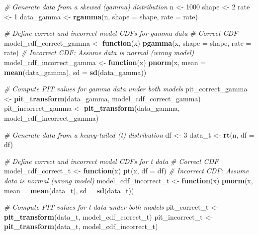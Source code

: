 \documentclass[
  letterpaper,
]{krantz}
\newenvironment{Shaded}{\begin{snugshade}}{\end{snugshade}}
\newcommand{\AttributeTok}[1]{\textcolor[rgb]{0.13,0.29,0.53}{#1}}
\newcommand{\CommentTok}[1]{\textcolor[rgb]{0.56,0.35,0.01}{\textit{#1}}}
\newcommand{\ControlFlowTok}[1]{\textcolor[rgb]{0.13,0.29,0.53}{\textbf{#1}}}
\newcommand{\DecValTok}[1]{\textcolor[rgb]{0.00,0.00,0.81}{#1}}
\newcommand{\FunctionTok}[1]{\textcolor[rgb]{0.13,0.29,0.53}{\textbf{#1}}}
\newcommand{\NormalTok}[1]{#1}
\newcommand{\OtherTok}[1]{\textcolor[rgb]{0.56,0.35,0.01}{#1}}
\begin{document}
\begin{Shaded}
\begin{Highlighting}[]
\CommentTok{\# Generate data from a skewed (gamma) distribution}
\NormalTok{n }\OtherTok{\textless{}{-}} \DecValTok{1000}
\NormalTok{shape }\OtherTok{\textless{}{-}} \DecValTok{2}
\NormalTok{rate }\OtherTok{\textless{}{-}} \DecValTok{1}
\NormalTok{data\_gamma }\OtherTok{\textless{}{-}} \FunctionTok{rgamma}\NormalTok{(n, }\AttributeTok{shape =}\NormalTok{ shape, }\AttributeTok{rate =}\NormalTok{ rate)}

\CommentTok{\# Define correct and incorrect model CDFs for gamma data}
\CommentTok{\# Correct CDF}
\NormalTok{model\_cdf\_correct\_gamma }\OtherTok{\textless{}{-}} \ControlFlowTok{function}\NormalTok{(x) }\FunctionTok{pgamma}\NormalTok{(x, }\AttributeTok{shape =}\NormalTok{ shape, }\AttributeTok{rate =}\NormalTok{ rate)}
\CommentTok{\# Incorrect CDF: Assume data is normal (wrong model)}
\NormalTok{model\_cdf\_incorrect\_gamma }\OtherTok{\textless{}{-}} \ControlFlowTok{function}\NormalTok{(x) }\FunctionTok{pnorm}\NormalTok{(x, }\AttributeTok{mean =} \FunctionTok{mean}\NormalTok{(data\_gamma), }\AttributeTok{sd =} \FunctionTok{sd}\NormalTok{(data\_gamma))}

\CommentTok{\# Compute PIT values for gamma data under both models}
\NormalTok{pit\_correct\_gamma }\OtherTok{\textless{}{-}} \FunctionTok{pit\_transform}\NormalTok{(data\_gamma, model\_cdf\_correct\_gamma)}
\NormalTok{pit\_incorrect\_gamma }\OtherTok{\textless{}{-}} \FunctionTok{pit\_transform}\NormalTok{(data\_gamma, model\_cdf\_incorrect\_gamma)}

\CommentTok{\# Generate data from a heavy{-}tailed (t) distribution}
\NormalTok{df }\OtherTok{\textless{}{-}} \DecValTok{3}
\NormalTok{data\_t }\OtherTok{\textless{}{-}} \FunctionTok{rt}\NormalTok{(n, }\AttributeTok{df =}\NormalTok{ df)}

\CommentTok{\# Define correct and incorrect model CDFs for t data}
\CommentTok{\# Correct CDF}
\NormalTok{model\_cdf\_correct\_t }\OtherTok{\textless{}{-}} \ControlFlowTok{function}\NormalTok{(x) }\FunctionTok{pt}\NormalTok{(x, }\AttributeTok{df =}\NormalTok{ df)}
\CommentTok{\# Incorrect CDF: Assume data is normal (wrong model)}
\NormalTok{model\_cdf\_incorrect\_t }\OtherTok{\textless{}{-}} \ControlFlowTok{function}\NormalTok{(x) }\FunctionTok{pnorm}\NormalTok{(x, }\AttributeTok{mean =} \FunctionTok{mean}\NormalTok{(data\_t), }\AttributeTok{sd =} \FunctionTok{sd}\NormalTok{(data\_t))}

\CommentTok{\# Compute PIT values for t data under both models}
\NormalTok{pit\_correct\_t }\OtherTok{\textless{}{-}} \FunctionTok{pit\_transform}\NormalTok{(data\_t, model\_cdf\_correct\_t)}
\NormalTok{pit\_incorrect\_t }\OtherTok{\textless{}{-}} \FunctionTok{pit\_transform}\NormalTok{(data\_t, model\_cdf\_incorrect\_t)}


\end{Highlighting}
\end{Shaded}
\end{document}
